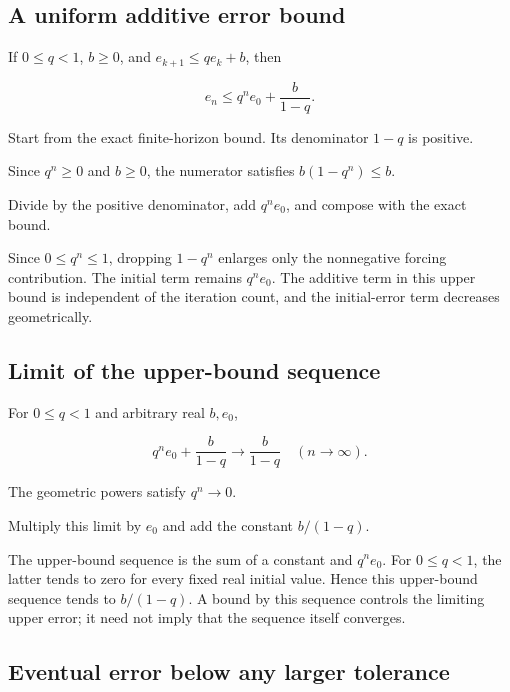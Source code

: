 \documentclass[11pt,a4paper]{article}
\begin{document}
\subsection{\texorpdfstring{A uniform additive error bound}{A uniform additive error bound}}


If \(0\le q<1\), \(b\ge0\), and \(e_{k+1}\le qe_k+b\), then

\[e_n\le q^ne_0+\frac b{1-q}.\]

Start from the exact finite-horizon bound. Its denominator \(1-q\) is positive.



Since \(q^n\ge0\) and \(b\ge0\), the numerator satisfies \(b(1-q^n)\le b\).



Divide by the positive denominator, add \(q^ne_0\), and compose with the exact bound.



Since \(0\le q^n\le1\), dropping \(1-q^n\) enlarges only the nonnegative forcing contribution. The initial term remains \(q^ne_0\). The additive term in this upper bound is independent of the iteration count, and the initial-error term decreases geometrically.


\subsection{\texorpdfstring{Limit of the upper-bound sequence}{Limit of the upper-bound sequence}}


For \(0\le q<1\) and arbitrary real \(b,e_0\),

\[q^ne_0+\frac b{1-q}\longrightarrow\frac b{1-q}\quad(n\to\infty).\]

The geometric powers satisfy \(q^n\to0\).



Multiply this limit by \(e_0\) and add the constant \(b/(1-q)\).



The upper-bound sequence is the sum of a constant and \(q^ne_0\). For \(0\le q<1\), the latter tends to zero for every fixed real initial value. Hence this upper-bound sequence tends to \(b/(1-q)\). A bound by this sequence controls the limiting upper error; it need not imply that the sequence itself converges.


\subsection{\texorpdfstring{Eventual error below any larger tolerance}{Eventual error below any larger tolerance}}
\end{document}
